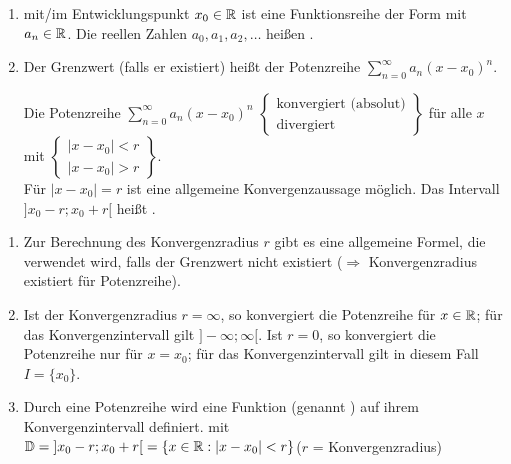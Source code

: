 \Def\quad
\begin{enumerate}
	\item {} mit/im Entwicklungspunkt $x_0\in\mathbb{R}$ ist eine Funktionsreihe der Form
	mit $a_n\in\mathbb{R}$. Die reellen Zahlen $a_0,a_1,a_2,\ldots$ heißen .
	
	\item Der Grenzwert (falls er existiert)
	heißt  der Potenzreihe $\sum\limits_{n=0}^{\infty}a_n(x-x_0)^n$.
	
	Die Potenzreihe $\sum\limits_{n=0}^{\infty}a_n(x-x_0)^n$ $\left\{\begin{array}{l}\text{konvergiert (absolut)}\\\text{divergiert}\end{array}\right\}$ für alle $x$ mit $\left\{\begin{array}{l}|x-x_0|<r\\|x-x_0|>r\end{array}\right\}$.\\
	Für $|x-x_0|=r$ ist eine allgemeine Konvergenzaussage  möglich.
	Das Intervall ${]x_0-r;x_0+r[}$ heißt .
\end{enumerate}

\Bem
\begin{enumerate}
	\item Zur Berechnung des Konvergenzradius $r$ gibt es eine allgemeine Formel, die verwendet wird, falls der Grenzwert nicht existiert ($\Rightarrow$ Konvergenzradius existiert für  Potenzreihe).
	
	\item Ist der Konvergenzradius $r=\infty$, so konvergiert die Potenzreihe für  $x\in\mathbb{R}$; für das Konvergenzintervall gilt ${]-\infty;\infty[}$. Ist $r=0$, so konvergiert die Potenzreihe nur für $x=x_0$; für das Konvergenzintervall gilt in diesem Fall $I=\{x_0\}$.
	
	\item Durch eine Potenzreihe wird eine Funktion (genannt ) auf ihrem Konvergenzintervall definiert.
	mit $\mathbb{D}={]x_0-r;x_0+r[}=\{x\in\mathbb{R}:|x-x_0|<r\}$\quad($r$ = Konvergenzradius)
\end{enumerate}

